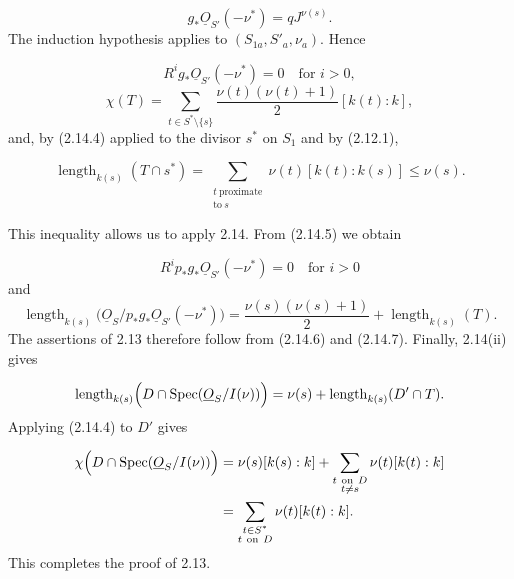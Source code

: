 \begin{equation}\tag{2.14.5}
g_*\underline{O}_{S'}(-\nu^*)=qJ^{\nu(s)}.
\end{equation}
The induction hypothesis applies to $(S_{1a},S'_a,\nu_a)$.  Hence

\begin{equation}\tag{2.14.6}
R^ig_*\underline{O}_{S'}(-\nu^*)=0\quad\text{for }i>0,
\end{equation}
\begin{equation}\tag{2.14.7}
\chi(T)=
\sum_{t\in S^*\setminus\{s\}}
\frac{\nu(t)(\nu(t)+1)}2[k(t):k],
\end{equation}
and, by (2.14.4) applied to the divisor $s^*$ on $S_1$ and by (2.12.1),

\begin{equation*}
\operatorname{length}_{k(s)}(T\cap s^*)
=\sum_{\substack{t\ \mathrm{proximate}\\\mathrm{to}\ s}}
\nu(t)[k(t):k(s)]
\leq\nu(s).
\end{equation*}


This inequality allows us to apply 2.14.  From (2.14.5) we obtain

\begin{equation*}
R^ip_*g_*\underline{O}_{S'}(-\nu^*)=0
\quad\text{for }i>0
\end{equation*}
and
\begin{equation*}
\operatorname{length}_{k(s)}
\bigl(\underline{O}_S/p_*g_*\underline{O}_{S'}(-\nu^*)\bigr)
=\frac{\nu(s)(\nu(s)+1)}2+\operatorname{length}_{k(s)}(T).
\end{equation*}
The assertions of 2.13 therefore follow from (2.14.6) and (2.14.7).  Finally,
2.14(ii) gives

\begin{equation*}
\operatorname{length}_{k(s)}
\Bigl(D\cap\operatorname{Spec}(\underline{O}_S/I(\nu))\Bigr)
=\nu(s)+\operatorname{length}_{k(s)}(D'\cap T).
\end{equation*}
Applying (2.14.4) to $D'$ gives

\begin{equation*}
\begin{aligned}
\chi\Bigl(D\cap\operatorname{Spec}(\underline{O}_S/I(\nu))\Bigr)
&=\nu(s)[k(s):k]
+\sum_{\substack{t\ \mathrm{on}\ D\\t\ne s}}
\nu(t)[k(t):k]\\
&=\sum_{\substack{t\in S^*\\t\ \mathrm{on}\ D}}
\nu(t)[k(t):k].
\end{aligned}
\end{equation*}
This completes the proof of 2.13.
